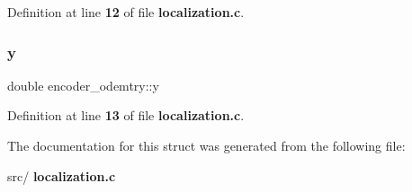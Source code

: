 Definition at line \textbf{ 12} of file \textbf{ localization.\+c}.

\mbox{\label{structencoder__odemtry_a955cbea800158b8c0cd5f36b253fe6bb}} 
\subsubsection{y}
{\footnotesize\ttfamily double encoder\+\_\+odemtry\+::y}



Definition at line \textbf{ 13} of file \textbf{ localization.\+c}.



The documentation for this struct was generated from the following file\+:\begin{DoxyCompactItemize}
\item 
src/\textbf{ localization.\+c}\end{DoxyCompactItemize}
